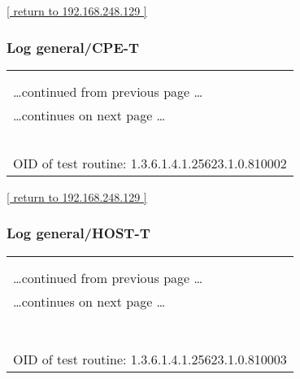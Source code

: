 \documentclass{article}
\begin{document}
\begin{footnotesize}\hyperref[host:192.168.248.129]{[ return to 192.168.248.129 ]}\end{footnotesize}
\subsubsection{Log general/CPE-T}
\label{port:192.168.248.129 general/CPE-T Log}

\begin{longtable}{|p{}|}
\hline
\rowcolor{openvas_log}{\color{white}{Log (CVSS: 0.0) }}\\
\rowcolor{openvas_log}{\color{white}{NVT: CPE Inventory}}\\
\hline
\endfirsthead
\hfill\ldots continued from previous page \ldots \\
\hline
\endhead
\hline
\ldots continues on next page \ldots \\
\endfoot
\hline
\endlastfoot
\\
\rowcolor{white}{\verb=192.168.248.129|cpe:/o:linux:kernel=}\\
\rowcolor{white}{\verb==}\\
\rowcolor{white}{\verb==}\\
\\
OID of test routine: 1.3.6.1.4.1.25623.1.0.810002\\
\end{longtable}

\begin{footnotesize}\hyperref[host:192.168.248.129]{[ return to 192.168.248.129 ]}\end{footnotesize}
\subsubsection{Log general/HOST-T}
\label{port:192.168.248.129 general/HOST-T Log}

\begin{longtable}{|p{}|}
\hline
\rowcolor{openvas_log}{\color{white}{Log (CVSS: 0.0) }}\\
\rowcolor{openvas_log}{\color{white}{NVT: Host Summary}}\\
\hline
\endfirsthead
\hfill\ldots continued from previous page \ldots \\
\hline
\endhead
\hline
\ldots continues on next page \ldots \\
\endfoot
\hline
\endlastfoot
\\
\rowcolor{white}{\verb=traceroute:192.168.248.132,192.168.248.129=}\\
\rowcolor{white}{\verb=TCP ports:23,80=}\\
\rowcolor{white}{\verb=UDP ports:=}\\
\rowcolor{white}{\verb==}\\
\rowcolor{white}{\verb==}\\
\\
OID of test routine: 1.3.6.1.4.1.25623.1.0.810003\\
\end{longtable}
\end{document}
